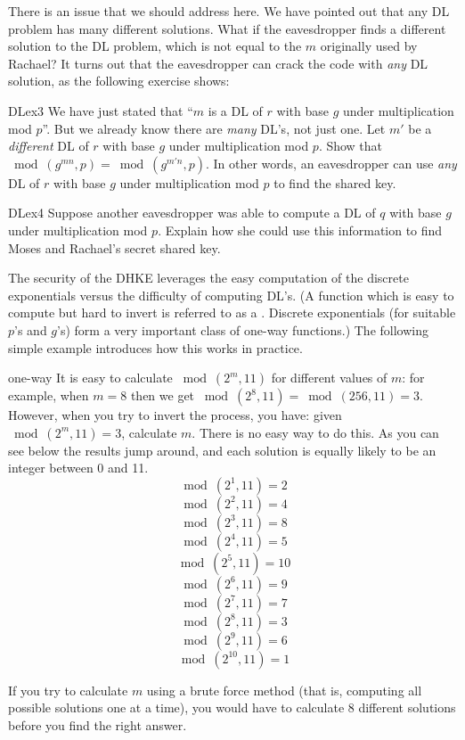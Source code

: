 There is an issue that we should address here. We have pointed out that any DL problem has many different solutions. What if the eavesdropper finds a different solution to the DL problem, which is not equal to the $m$ originally used by Rachael? It turns out that the eavesdropper can crack the code with \emph{any} DL solution, as the following exercise shows:

\begin{exercise}{DLex3}
We have just stated that ``$m$ is a DL of $r$ with base $g$ under multiplication mod $p$''.  But we already know there are \emph{many} DL's, not just one. Let $m'$ be a \emph{different} DL of $r$ with base $g$ under multiplication mod $p$. Show that $\bmod(g^{mn},p)=\bmod(g^{m'n},p)$. In other words, an eavesdropper can use \emph{any} DL of $r$ with base $g$ under multiplication mod $p$ to find the shared key.
\end{exercise}

\begin{exercise}{DLex4}
Suppose another eavesdropper was able to compute a DL of $q$ with base $g$ under multiplication mod $p$.  Explain how she could use this information to find Moses and Rachael's secret shared key.
\end{exercise}

The security of the DHKE leverages the easy computation of the discrete exponentials versus the difficulty of computing DL's. (A function which is easy to compute but hard to invert is referred to as a . Discrete exponentials (for suitable $p$'s and $g$'s) form a very important class of one-way functions.)
The following simple example introduces how this works in practice. 

\begin{example}{one-way}
It is easy to calculate $\bmod(2^{m},  11)$ for different values of $m$: for example, when $m =8$ then we get $\bmod(2^{8},  11) =\bmod(256,  11)  = 3$.  However, when you try to invert the process, you have: given $\bmod(2^{m},  11) = 3$, calculate $m$. There is no easy way to do this. As you can see below the results jump around, and each solution is equally likely to be an integer between 0 and 11. 
$$ \bmod(2^{1}, 11)=2$$
$$ \bmod(2^{2}, 11)=4$$
$$ \bmod(2^{3}, 11)=8$$
$$ \bmod(2^{4}, 11)=5$$
$$ \bmod(2^{5}, 11)=10$$
$$ \bmod(2^{6}, 11)=9$$
$$ \bmod(2^{7}, 11)=7$$
$$ \bmod(2^{8}, 11)=3$$
$$ \bmod(2^{9}, 11)=6$$
$$ \bmod(2^{10}, 11)=1$$
\end{example}
If you try to calculate $m$ using a brute force method (that is, computing all possible solutions one at a time), you would have to calculate 8 different solutions before you find the right answer. 

